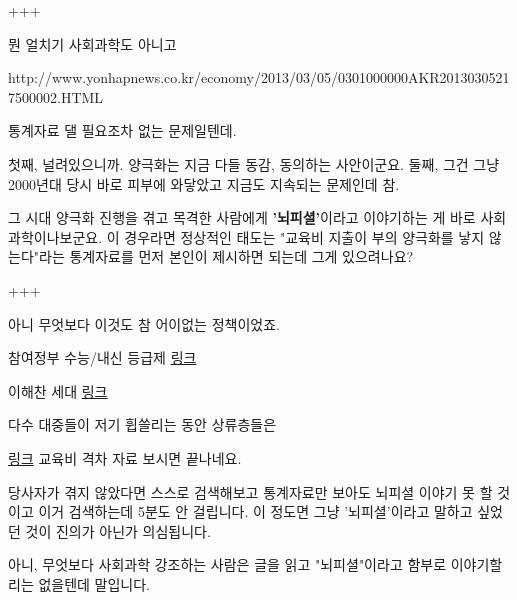 +++
\vspace{5mm}

뭔 얼치기 사회과학도 아니고
\vspace{5mm}

http://www.yonhapnews.co.kr/economy/2013/03/05/0301000000AKR20130305217500002.HTML
\vspace{5mm}

통계자료 댈 필요조차 없는 문제일텐데.
\vspace{5mm}

첫째, 널려있으니까. 양극화는 지금 다들 동감, 동의하는 사안이군요.
둘째, 그건 그냥 2000년대 당시 바로 피부에 와닿았고 지금도 지속되는 문제인데 참.
\vspace{5mm}

그 시대 양극화 진행을 겪고 목격한 사람에게 \textbf{'뇌피셜'}이라고 이야기하는 게 바로 사회과학이나보군요.
이 경우라면 정상적인 태도는 "교육비 지출이 부의 양극화를 낳지 않는다"라는 통계자료를 먼저 본인이 제시하면 되는데
그게 있으려나요?
\vspace{5mm}

+++
\vspace{5mm}

아니 무엇보다 이것도 참 어이없는 정책이었죠.
\vspace{5mm}

참여정부 수능/내신 등급제
\href{https://namu.wiki/w/%EB%82%B4%EC%8B%A0/%EC%88%98%EB%8A%A5%209%EB%93%B1%EA%B8%89%EC%A0%9C}{링크}
\vspace{5mm}

이해찬 세대
\href{https://namu.wiki/w/%EC%9D%B4%ED%95%B4%EC%B0%AC%20%EC%84%B8%EB%8C%80}{링크}
\vspace{5mm}

다수 대중들이 저기 휩쓸리는 동안 상류층들은
\vspace{5mm}

\href{http://biz.khan.co.kr/khan_art_view.html?artid=200909131803125&code=920100&med=khan}{링크}
교육비 격차 자료 보시면 끝나네요.
\vspace{5mm}

당사자가 겪지 않았다면 스스로 검색해보고 통계자료만 보아도 뇌피셜 이야기 못 할 것이고
이거 검색하는데 5분도 안 걸립니다. 이 정도면 그냥 '뇌피셜'이라고 말하고 싶었던 것이 진의가 아닌가 의심됩니다.
\vspace{5mm}

아니, 무엇보다 사회과학 강조하는 사람은 글을 읽고 "뇌피셜"이라고 함부로 이야기할 리는 없을텐데 말입니다.







